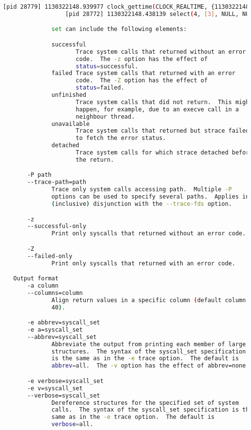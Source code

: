 {{\begin{lstlisting}[language=bash]
                  [pid 28779] 1130322148.939977 clock_gettime(CLOCK_REALTIME, {1130322148, 939977000}) = 0
                  [pid 28772] 1130322148.438139 select(4, [3], NULL, NULL, NULL) = 1 (in [3])

              set can include the following elements:

              successful
                     Trace system calls that returned without an error
                     code.  The -z option has the effect of
                     status=successful.
              failed Trace system calls that returned with an error
                     code.  The -Z option has the effect of
                     status=failed.
              unfinished
                     Trace system calls that did not return.  This might
                     happen, for example, due to an execve call in a
                     neighbour thread.
              unavailable
                     Trace system calls that returned but strace failed
                     to fetch the error status.
              detached
                     Trace system calls for which strace detached before
                     the return.

       -P path
       --trace-path=path
              Trace only system calls accessing path.  Multiple -P
              options can be used to specify several paths.  Applies in
              (inclusive) disjunction with the --trace-fds option.

       -z
       --successful-only
              Print only syscalls that returned without an error code.

       -Z
       --failed-only
              Print only syscalls that returned with an error code.

   Output format
       -a column
       --columns=column
              Align return values in a specific column (default column
              40).

       -e abbrev=syscall_set
       -e a=syscall_set
       --abbrev=syscall_set
              Abbreviate the output from printing each member of large
              structures.  The syntax of the syscall_set specification
              is the same as in the -e trace option.  The default is
              abbrev=all.  The -v option has the effect of abbrev=none.

       -e verbose=syscall_set
       -e v=syscall_set
       --verbose=syscall_set
              Dereference structures for the specified set of system
              calls.  The syntax of the syscall_set specification is the
              same as in the -e trace option.  The default is
              verbose=all.


\end{lstlisting}}}
